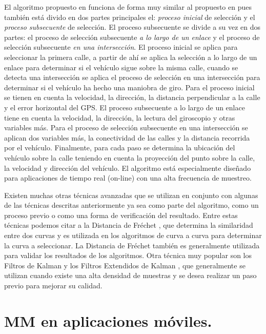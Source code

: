El algoritmo propuesto en \cite{quddus2006high} funciona de forma muy similar al propuesto en \cite{ochieng2009map} pues también está divido en dos partes principales el: \emph{proceso inicial} de selección y el \emph{proceso subsecuente} de selección. El proceso subsecuente se divide a su vez en dos partes: el proceso de selección subsecuente \emph{a lo largo de un enlace} y el proceso de selección subsecuente \emph{en una intersección}. El proceso inicial se aplica para seleccionar la primera calle, a partir de ahí se aplica la  selección a lo largo de un enlace para determinar si el vehículo sigue sobre la misma calle, cuando se detecta una intersección se aplica el proceso de selección en una intersección para determinar si el vehículo ha hecho una maniobra de giro. Para el proceso inicial se tienen en cuenta la velocidad, la dirección, la distancia perpendicular a la calle y el error horizontal del GPS. El proceso subsecuente a lo largo de un enlace tiene en cuenta la velocidad, la dirección, la lectura del giroscopio y otras variables más. Para el proceso de selección subsecuente en una intersección se aplican dos variables más, la conectividad de las calles y la distancia recorrida por el vehículo. Finalmente, para cada paso se determina la ubicación del vehículo sobre la calle teniendo en cuenta la proyección del punto sobre la calle, la velocidad y dirección del vehículo. El algoritmo está especialmente diseñado para aplicaciones de tiempo real (on-line) con una alta frecuencia de muestreo.

Existen muchas otras técnicas avanzadas que se utilizan en conjunto con algunas de las técnicas descritas anteriormente ya sea como parte del algoritmo, como un proceso previo o como una forma de verificación del resultado. Entre estas técnicas podemos citar a la Distancia de Fréchet \cite{chen2011approximate,eisner2011algorithms}, que determina la similaridad entre dos curvas y es utilizada en los algoritmos de curva a curva para determinar la curva a seleccionar. La Distancia de Fréchet también es generalmente utilizada para validar los resultados de los algoritmos. Otra técnica muy popular son los Filtros de Kalman y los Filtros Extendidos de Kalman \cite{kim2001adaptive}, que generalmente se utilizan cuando existe una alta densidad de muestras y se desea realizar un paso previo para mejorar su calidad.

\section{MM en aplicaciones móviles.}

